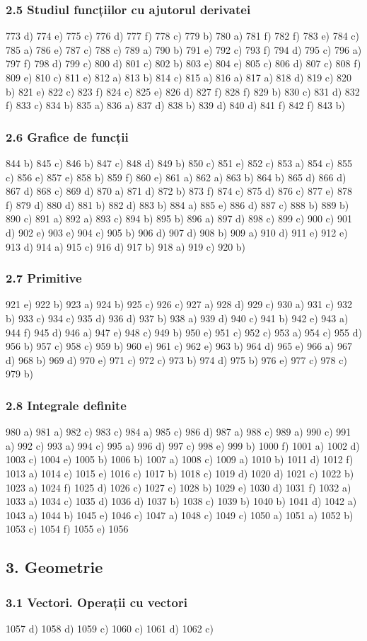 \documentclass[11pt]{article}
\begin{document}
\subsubsection*{2.5 Studiul funcțiilor cu ajutorul derivatei}
773 d) 774 e) 775 c) 776 d) 777 f) 778 c) 779 b) 780 a) 781 f) 782 f) 783 e) 784 c) 785 a) 786 e) 787 c) 788 c) 789 a) 790 b) 791 e) 792 c) 793 f) 794 d) 795 c) 796 a) 797 f) 798 d) 799 c) 800 d) 801 c) 802 b) 803 e) 804 e) 805 c) 806 d) 807 c) 808 f) 809 e) 810 c) 811 e) 812 a) 813 b) 814 c) 815 a) 816 a) 817 a) 818 d) 819 c) 820 b) 821 e) 822 c) 823 f) 824 c) 825 e) 826 d) 827 f) 828 f) 829 b) 830 c) 831 d) 832 f) 833 c) 834 b) 835 a) 836 a) 837 d) 838 b) 839 d) 840 d) 841 f) 842 f) 843 b)

\subsubsection*{2.6 Grafice de funcții}
844 b) 845 c) 846 b) 847 c) 848 d) 849 b) 850 c) 851 e) 852 c) 853 a) 854 c) 855 c) 856 e) 857 e) 858 b) 859 f) 860 e) 861 a) 862 a) 863 b) 864 b) 865 d) 866 d) 867 d) 868 c) 869 d) 870 a) 871 d) 872 b) 873 f) 874 c) 875 d) 876 c) 877 e) 878 f) 879 d) 880 d) 881 b) 882 d) 883 b) 884 a) 885 e) 886 d) 887 c) 888 b) 889 b) 890 c) 891 a) 892 a) 893 c) 894 b) 895 b) 896 a) 897 d) 898 c) 899 c) 900 c) 901 d) 902 e) 903 e) 904 c) 905 b) 906 d) 907 d) 908 b) 909 a) 910 d) 911 e) 912 e) 913 d) 914 a) 915 c) 916 d) 917 b) 918 a) 919 c) 920 b)

\subsubsection*{2.7 Primitive}
921 e) 922 b) 923 a) 924 b) 925 c) 926 c) 927 a) 928 d) 929 c) 930 a) 931 c) 932 b) 933 c) 934 c) 935 d) 936 d) 937 b) 938 a) 939 d) 940 c) 941 b) 942 e) 943 a) 944 f) 945 d) 946 a) 947 e) 948 c) 949 b) 950 e) 951 c) 952 c) 953 a) 954 c) 955 d) 956 b) 957 c) 958 c) 959 b) 960 e) 961 c) 962 e) 963 b) 964 d) 965 e) 966 a) 967 d) 968 b) 969 d) 970 e) 971 c) 972 c) 973 b) 974 d) 975 b) 976 e) 977 c) 978 c) 979 b)

\subsubsection*{2.8 Integrale definite}
980 a) 981 a) 982 c) 983 c) 984 a) 985 c) 986 d) 987 a) 988 c) 989 a) 990 c) 991 a) 992 c) 993 a) 994 c) 995 a) 996 d) 997 c) 998 e) 999 b) 1000 f) 1001 a) 1002 d) 1003 c) 1004 e) 1005 b) 1006 b) 1007 a) 1008 c) 1009 a) 1010 b) 1011 d) 1012 f) 1013 a) 1014 c) 1015 e) 1016 c) 1017 b) 1018 c) 1019 d) 1020 d) 1021 c) 1022 b) 1023 a) 1024 f) 1025 d) 1026 c) 1027 c) 1028 b) 1029 e) 1030 d) 1031 f) 1032 a) 1033 a) 1034 c) 1035 d) 1036 d) 1037 b) 1038 c) 1039 b) 1040 b) 1041 d) 1042 a) 1043 a) 1044 b) 1045 e) 1046 c) 1047 a) 1048 c) 1049 c) 1050 a) 1051 a) 1052 b) 1053 c) 1054 f) 1055 e) 1056

\subsection*{3. Geometrie}
\subsubsection*{3.1 Vectori. Operații cu vectori}
1057 d) 1058 d) 1059 c) 1060 c) 1061 d) 1062 c)
\end{document}
